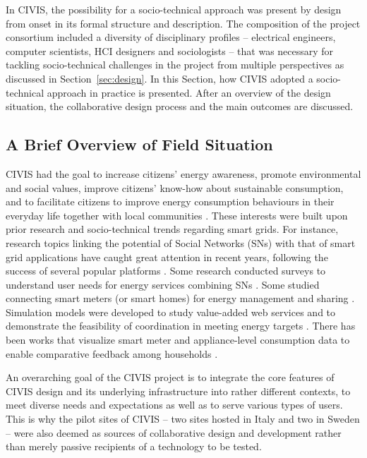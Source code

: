 In CIVIS, the possibility for a socio-technical approach was present by design from onset
in its formal structure and description.
The composition of the project consortium included a diversity of disciplinary profiles -- electrical engineers, computer scientists, HCI designers and sociologists -- that was necessary for tackling socio-technical challenges in the project from multiple perspectives as discussed in Section~\ref{sec:design}. 
% 
In this Section, how CIVIS adopted %
a socio-technical approach in practice is presented. After an overview of the design situation,
the collaborative design process and the main outcomes are discussed.

\subsection{A Brief Overview of Field Situation}

CIVIS had the goal to increase citizens' energy awareness, promote environmental and social values, improve citizens' know-how about sustainable consumption, and to facilitate citizens to improve energy consumption behaviours in their everyday life together with local communities \cite{Huang2014,Huang2015a,Huang2016}. 
These interests were built upon prior research and socio-technical trends regarding smart grids.
For instance, research topics linking the potential of Social Networks (SNs) with that of smart grid applications 
have caught great attention in recent years, following the success of several popular platforms 
\cite{Boslet2010,Chima2011,Erickson2012,Fang2013,Huang2015}. 
Some research conducted surveys to understand user needs for energy services combining SNs \cite{Silva2012}. 
Some studied connecting smart meters (or smart homes) for energy management and
sharing \cite{Ciuciu2012,Steinheimer2012}. 
Simulation models were developed to study value-added web services \cite{De-Haan2011,Lei2012,Chatzidimitriou2013} and to 
demonstrate the feasibility of coordination in meeting energy targets \cite{Worm2013,Skopik2014}.
There has been works that visualize smart meter and appliance-level consumption data to enable comparative feedback among households \cite{Petkov2011,Weiss2012,Dillahunt2014}.

An overarching goal of the CIVIS project is to integrate the core features of CIVIS design and its underlying infrastructure into rather different contexts, to meet diverse needs and expectations as well as to serve various types of users. 
This is why the pilot sites of CIVIS -- two sites hosted in Italy and two in Sweden -- were also deemed as sources of collaborative design and development rather than merely passive recipients of a technology to be tested.  

